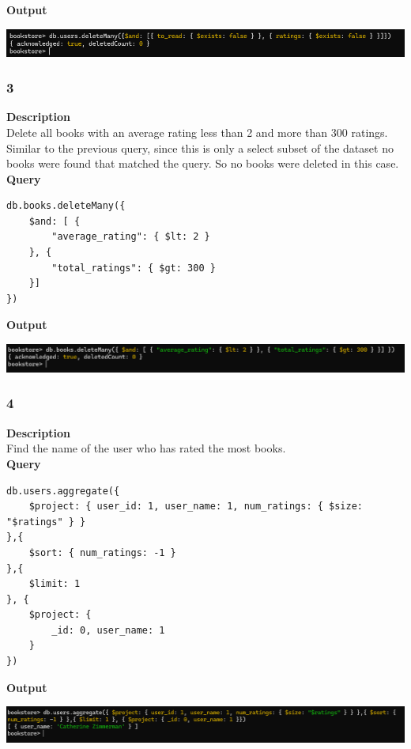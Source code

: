 \documentclass[11pt]{article}
\begin{document}
\linebreak
\textbf{Output}\\
\begin{center}
\includegraphics[width=1\textwidth]{images/WHLJOS001/2.png}
\end{center}
\pagebreak
\subsubsection{3}
\label{sec:org26f40a4}
\textbf{Description}\\
Delete all books with an average rating less than 2 and more than 300 ratings. Similar to the previous query, since this is only a select subset of the dataset no books were found that matched the query. So no books were deleted in this case.\\
\linebreak
\textbf{Query}
\begin{verbatim}
db.books.deleteMany({
    $and: [ {
        "average_rating": { $lt: 2 }
    }, {
        "total_ratings": { $gt: 300 }
    }]
})
\end{verbatim}
\linebreak
\textbf{Output}\\

\begin{center}
\includegraphics[width=1\textwidth]{images/WHLJOS001/3.png}
\end{center}
\pagebreak
\subsubsection{4}
\label{sec:org6c5eab5}
\textbf{Description}\\
Find the name of the user who has rated the most books.\\
\linebreak
\textbf{Query}
\begin{verbatim}
db.users.aggregate({
    $project: { user_id: 1, user_name: 1, num_ratings: { $size: "$ratings" } }
},{
    $sort: { num_ratings: -1 }
},{
    $limit: 1
}, {
    $project: {
        _id: 0, user_name: 1
    }
})
\end{verbatim}

\linebreak
\textbf{Output}\\
\begin{center}
\includegraphics[width=1\textwidth]{images/WHLJOS001/4.png}
\end{center}
\pagebreak
\end{document}
